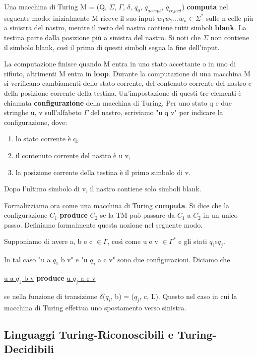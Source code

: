 \documentclass{article}
\begin{document}
Una macchina di Turing M = (Q, $\Sigma$, $\Gamma$, $\delta$, $q_0$, $q_{accept}$, $q_{reject}$) \textbf{computa} nel seguente modo: inizialmente M riceve il suo input $w_1w_2...w_n \in \Sigma^*$ sulle n celle più a sinistra del nastro, mentre il resto del nastro contiene tutti simboli \textbf{blank}. La testina parte dalla posizione più a sinistra del nastro. Si noti che $\Sigma$ non contiene il simbolo blank, così il primo di questi simboli segna la fine dell'input.

La computazione finisce quando M entra in uno stato accettante o in uno di rifiuto, altrimenti M entra in \textbf{loop}. Durante la computazione di una macchina M si verificano cambiamenti dello stato corrente, del contenuto corrente del nastro e della posizione corrente della testina. Un'impostazione di questi tre elementi è chiamata \textbf{configurazione} della macchina di Turing. Per uno stato q e due stringhe u, v sull'alfabeto $\Gamma$ del nastro, scriviamo "u q v" per indicare la configurazione, dove:

\begin{enumerate}
    \item lo stato corrente è q,
    \item il contenuto corrente del nastro è u v,
    \item la posizione corrente della testina è il primo simbolo di v.
\end{enumerate}

Dopo l'ultimo simbolo di v, il nastro contiene solo simboli blank.

Formalizziamo ora come una macchina di Turing \textbf{computa}. Si dice che la configurazione $C_1$ \textbf{produce} $C_2$ se la TM può passare da $C_1$ a $C_2$ in un unico passo. Definiamo formalmente questa nozione nel seguente modo.

Supponiamo di avere a, b e c $\in \Gamma$, così come u e v $\in \Gamma^*$ e gli stati $q_i e q_j$.

In tal caso "u a $q_1$ b v" e "u $q_j$ a c v" sono due configurazioni. Diciamo che

\begin{center}
    \underline{u a $q_1$ b v} \textbf{produce} \underline{u $q_j$ a c v}
\end{center}

se nella funzione di transizione $\delta$($q_i$, b) = ($q_j$, c, L). Questo nel caso in cui la macchina di Turing effettua uno spostamento verso sinistra.

\subsection{Linguaggi Turing-Riconoscibili e Turing-Decidibili}
\end{document}
